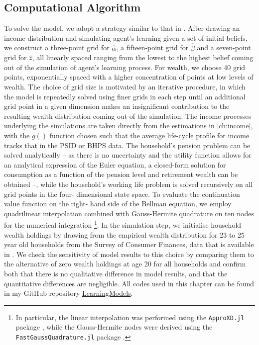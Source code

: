\subsection{Computational Algorithm}
To solve the model, we adopt a strategy similar to that in \citet{GuvenenSmith2014}.
After drawing an income distribution and simulating agent's learning given a set
of initial beliefs, we construct a three-point grid for $\hat{\alpha}$, a 
fifteen-point grid for $\hat{\beta}$ and a seven-point grid for $\hat{z}$, all
linearly spaced ranging from the lowest to the highest belief coming out of the
simulation of agent's learning process. For wealth, we choose 40 grid points, 
exponentially spaced with a higher concentration of points at low levels of wealth.
The choice of grid size is motivated by an iterative procedure, in which the model
is repeatedly solved using finer grids in each step until an additional grid point
in a given dimension makes an insignificant contribution to the resulting wealth
distribution coming out of the simulation. 
The income processes underlying the simulations are taken directly from the estimations
in \ref{ch:income}, with the $g()$ function chosen such that the average life-cycle
profile for income tracks that in the PSID or BHPS data. 
The household's pension problem can be solved analytically -- as there is no 
uncertainty and the utility function allows for an analytical expression of the 
Euler equation, a closed-form solution for consumption as a function of the 
pension level and retirement wealth can be obtained --, while the household's 
working life problem is solved recursively on all grid points in the four-
dimensional state space. To evaluate the continuation value function on the right-
hand side of the Bellman equation, we employ quadrilinear interpolation combined
with Gauss-Hermite quadrature on ten nodes for the numerical integration
\footnote{In particular, the linear interpolation was performed using the 
\texttt{ApproXD.jl} package \citep{Oswald2014}, while the Gauss-Hermite nodes
were derived using the \texttt{FastGaussQuadrature.jl} package \citep{Townsend2015}.}. In the
simulation step, we initialise household wealth holdings by drawing from the empirical 
wealth distribution for 23 to 25 year old households from the Survey of Consumer
Finances, data that is available in \cite{HintermaierKoeniger2011}. We check 
the sensitivity of model results to this choice by comparing them to the 
alternative of zero wealth holdings at age 20 for all households and confirm both
that there is no qualitative difference in model results, and that the quantitative
differences are negligible. All codes used in this chapter can be found in my 
GitHub repository \href{https://github.com/nilshg/LearningModels}{LearningModels}.


